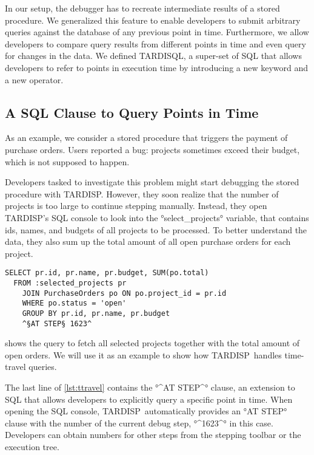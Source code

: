 \documentclass[english]{sig-alternate-05-2015}
\newcommand{\tool}{TARDISP}
\newcommand{\SQLextension}{TARDISQL}
\begin{document}
In our setup, the debugger has to recreate intermediate results of a stored procedure.
We generalized this feature to enable developers to submit arbitrary queries against the database of any previous point in time.
Furthermore, we allow developers to compare query results from different points in time and even query for changes in the data.
We defined \SQLextension, a super-set of SQL that allows developers to refer to points in execution time by introducing a new keyword and a new operator.

\subsection{A SQL Clause to Query Points in Time}

As an example, we consider a stored procedure that triggers the payment of purchase orders.
Users reported a bug: projects sometimes exceed their budget, which is not supposed to happen.

Developers tasked to investigate this problem might start debugging the stored procedure with \tool.
However, they soon realize that the number of projects is too large to continue stepping manually.
Instead, they open \tool's SQL console to look into the °select_projects° variable, that contains ids, names, and budgets of all projects to be processed.
To better understand the data, they also sum up the total amount of all open purchase orders for each project.

\begin{lstlisting}[language=HanaSQL,float,caption={Example for a time-travel query: select the current total of open orders for previously selected projects},label=lst:ttravel]
  SELECT pr.id, pr.name, pr.budget, SUM(po.total)
  FROM :selected_projects pr
	JOIN PurchaseOrders po ON po.project_id = pr.id
	WHERE po.status = 'open'
	GROUP BY pr.id, pr.name, pr.budget
	^§AT STEP§ 1623^
\end{lstlisting}

 shows the query to fetch all selected projects together with the total amount of open orders.
We will use it as an example to show how \tool\, handles time-travel queries.

The last line of \cref{lst:ttravel} contains the °^AT STEP^° clause, an extension to SQL that allows developers to explicitly query a specific point in time. 
When opening the SQL console, \tool\, automatically provides an °AT STEP° clause with the number of the current debug step, °^1623^° in this case.
Developers can obtain numbers for other steps from the stepping toolbar or the execution tree. 
\end{document}
